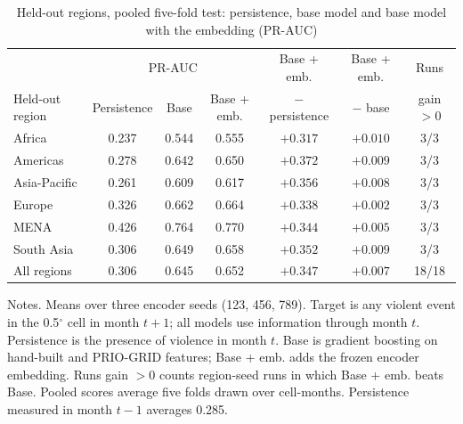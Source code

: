 \begin{table}[!htbp]
\centering\footnotesize\setlength{\tabcolsep}{4pt}
\caption{Held-out regions, pooled five-fold test: persistence, base model and base model with the embedding (PR-AUC)}
\label{tab:nested_embbase}
\begin{tabular}{lcccccc}
\hline
 & \multicolumn{3}{c}{PR-AUC} & Base + emb. & Base + emb. & Runs \\
Held-out region & Persistence & Base & Base + emb. & $-$ persistence & $-$ base & gain $>0$ \\
\hline
Africa & 0.237 & 0.544 & 0.555 & $+0.317$ & $+0.010$ & 3/3 \\
Americas & 0.278 & 0.642 & 0.650 & $+0.372$ & $+0.009$ & 3/3 \\
Asia-Pacific & 0.261 & 0.609 & 0.617 & $+0.356$ & $+0.008$ & 3/3 \\
Europe & 0.326 & 0.662 & 0.664 & $+0.338$ & $+0.002$ & 3/3 \\
MENA & 0.426 & 0.764 & 0.770 & $+0.344$ & $+0.005$ & 3/3 \\
South Asia & 0.306 & 0.649 & 0.658 & $+0.352$ & $+0.009$ & 3/3 \\
\hline
All regions & 0.306 & 0.645 & 0.652 & $+0.347$ & $+0.007$ & 18/18 \\
\hline
\end{tabular}
\begin{minipage}{0.98\textwidth}\footnotesize\vspace{0.5ex}
Notes. Means over three encoder seeds (123, 456, 789). Target is any violent event in the 0.5$^\circ$ cell in month $t+1$; all models use information through month $t$. Persistence is the presence of violence in month $t$. Base is gradient boosting on hand-built and PRIO-GRID features; Base + emb. adds the frozen encoder embedding. Runs gain $>0$ counts region-seed runs in which Base + emb. beats Base. Pooled scores average five folds drawn over cell-months. Persistence measured in month $t-1$ averages 0.285.
\end{minipage}
\end{table}
